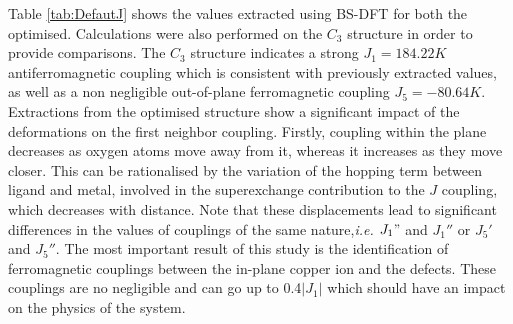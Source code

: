 \documentclass[12pt]{report}
\numberwithin{equation}{section}
\begin{document}
Table \ref{tab:DefautJ} shows the values extracted using BS-DFT for both the optimised.
Calculations were also performed on the $C_3$ structure in order to provide comparisons.
The $C_3$ structure indicates a strong $J_1=184.22K$ antiferromagnetic coupling which is consistent with previously extracted values, as well as a non negligible out-of-plane ferromagnetic coupling $J_5=-80.64K$. 
Extractions from the optimised structure show a significant impact of the deformations on the first neighbor coupling.
Firstly, coupling within the plane decreases as oxygen atoms move away from it, whereas it increases as they move closer.
This can be rationalised by the variation of the hopping term between ligand and metal, involved in the superexchange contribution to the $J$ coupling, which decreases with distance.
Note that these displacements lead to significant differences in the values of couplings of the same nature,\textit{i.e.} $J_1"$ and $J_1''$ or $J_5'$ and $J_5''$.
The most important result of this study is the identification of ferromagnetic couplings between the in-plane copper ion and the defects.
These couplings are no negligible and can go up to 0.4$|J_1|$ which should have an impact on the physics of the system.







\end{document}
